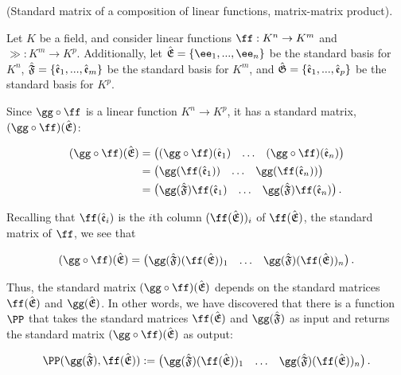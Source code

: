 \begin{defn}
\label{ch::lin_alg::thm::matrix_matrix_product_relative_to_bases_standard}
    (Standard matrix of a composition of linear functions, matrix-matrix product). 
    
    Let $K$ be a field, and consider linear functions $\ff:K^n \rightarrow K^m$ and $\gg:K^m \rightarrow K^p$. Additionally, let $\sE = \{\ee_1, ..., \ee_n\}$ be the standard basis for $K^n$, ${\hat{\mathfrak{F}}} = \{\hat{\mathfrak{e}}_1, ..., \hat{\mathfrak{e}}_m\}$ be the standard basis for $K^m$, and ${\hat{\mathfrak{G}}} = \{\hat{\mathfrak{e}}_1, ..., \hat{\mathfrak{e}}_p\}$ be the standard basis for $K^p$.
    
    Since $\gg \circ \ff$ is a linear function $K^n \rightarrow K^p$, it has a standard matrix, $(\gg \circ \ff)(\sE)$:
    
    \begin{align*}
        (\gg \circ \ff)(\sE)
        &=
        \begin{pmatrix}
            (\gg \circ \ff)(\see_1) & \hdots & (\gg \circ \ff)(\see_n)
        \end{pmatrix} \\
        &=
        \begin{pmatrix}
            \gg(\ff(\see_1)) & \hdots & \gg(\ff(\see_n))
        \end{pmatrix} \\
        &=
        \begin{pmatrix}
            \gg(\sF) \ff(\see_1) & \hdots & \gg(\sF) \ff(\see_n)
        \end{pmatrix}.
    \end{align*}
    
    Recalling that $\ff(\see_i)$ is the $i$th column $(\ff(\sE))_i$ of $\ff(\sE)$, the standard matrix of $\ff$, we see that
    
    \begin{align*}
        (\gg \circ \ff)(\sE) = 
        \begin{pmatrix} 
            \gg(\sF) (\ff(\sE))_1 & \hdots & \gg(\sF) (\ff(\sE))_n
        \end{pmatrix}.
    \end{align*}
    
    Thus, the standard matrix $(\gg \circ \ff)(\sE)$ depends on the standard matrices $\ff(\sE)$ and $\gg(\sE)$. In other words, we have discovered that there is a function $\PP$ that takes the standard matrices $\ff(\sE)$ and $\gg(\sF)$ as input and returns the standard matrix $(\gg \circ \ff)(\sE)$ as output:
    
    \begin{align*}
        \PP(\gg(\sF), \ff(\sE)) := \begin{pmatrix} 
            \gg(\sF) (\ff(\sE))_1 & \hdots & \gg(\sF) (\ff(\sE))_n
        \end{pmatrix}.
    \end{align*}
    

\end{defn}

